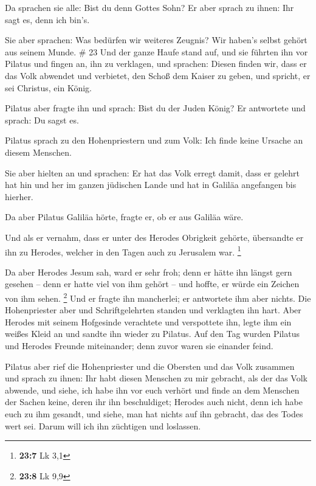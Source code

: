  Da sprachen sie alle: Bist du denn Gottes Sohn? Er aber
sprach zu ihnen: Ihr sagt es, denn ich bin's.

 Sie aber sprachen: Was bedürfen wir weiteres Zeugnis?
Wir haben's selbst gehört aus seinem Munde. \# 23  Und der
ganze Haufe stand auf, und sie führten ihn vor Pilatus 
und fingen an, ihn zu verklagen, und sprachen: Diesen finden wir, dass
er das Volk abwendet und verbietet, den Schoß dem Kaiser zu geben, und
spricht, er sei Christus, ein König.

 Pilatus aber fragte ihn und sprach: Bist du der Juden
König? Er antwortete und sprach: Du sagst es.

 Pilatus sprach zu den Hohenpriestern und zum Volk: Ich
finde keine Ursache an diesem Menschen.

 Sie aber hielten an und sprachen: Er hat das Volk erregt
damit, dass er gelehrt hat hin und her im ganzen jüdischen Lande und hat
in Galiläa angefangen bis hierher.

 Da aber Pilatus Galiläa hörte, fragte er, ob er aus
Galiläa wäre.

 Und als er vernahm, dass er unter des Herodes Obrigkeit
gehörte, übersandte er ihn zu Herodes, welcher in den Tagen auch zu
Jerusalem war. \footnote{\textbf{23:7} Lk 3,1}

 Da aber Herodes Jesum sah, ward er sehr froh; denn er
hätte ihn längst gern gesehen -- denn er hatte viel von ihm gehört --
und hoffte, er würde ein Zeichen von ihm sehen. \footnote{\textbf{23:8}
  Lk 9,9}  Und er fragte ihn mancherlei; er antwortete ihm
aber nichts.  Die Hohenpriester aber und Schriftgelehrten
standen und verklagten ihn hart.  Aber Herodes mit seinem
Hofgesinde verachtete und verspottete ihn, legte ihm ein weißes Kleid an
und sandte ihn wieder zu Pilatus.  Auf den Tag wurden
Pilatus und Herodes Freunde miteinander; denn zuvor waren sie einander
feind.

 Pilatus aber rief die Hohenpriester und die Obersten und
das Volk zusammen  und sprach zu ihnen: Ihr habt diesen
Menschen zu mir gebracht, als der das Volk abwende, und siehe, ich habe
ihn vor euch verhört und finde an dem Menschen der Sachen keine, deren
ihr ihn beschuldiget;  Herodes auch nicht, denn ich habe
euch zu ihm gesandt, und siehe, man hat nichts auf ihn gebracht, das des
Todes wert sei.  Darum will ich ihn züchtigen und
loslassen.

